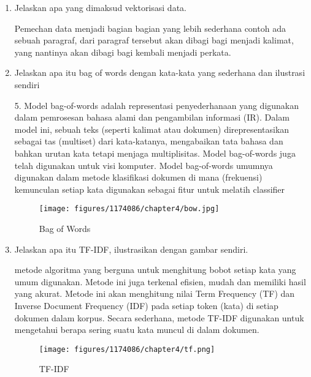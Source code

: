 \begin{enumerate}
        \item Jelaskan apa yang dimaksud vektorisasi data.
        
        Pemechan data menjadi bagian bagian yang lebih sederhana contoh ada sebuah paragraf, dari paragraf tersebut akan dibagi bagi menjadi kalimat, yang nantinya akan dibagi bagi kembali menjadi perkata.

        \item Jelaskan apa itu bag of words dengan kata-kata yang sederhana dan ilustrasi sendiri
        
        5.  Model bag-of-words adalah representasi penyederhanaan yang digunakan dalam pemrosesan bahasa alami dan pengambilan informasi (IR). Dalam model ini, sebuah teks (seperti kalimat atau dokumen) direpresentasikan sebagai tas (multiset) dari kata-katanya, mengabaikan tata bahasa dan bahkan urutan kata tetapi menjaga multiplisitas. Model bag-of-words juga telah digunakan untuk visi komputer. Model bag-of-words umumnya digunakan dalam metode klasifikasi dokumen di mana (frekuensi) kemunculan setiap kata digunakan sebagai fitur untuk melatih classifier
        \begin{figure}[H]
            \texttt{[image: figures/1174086/chapter4/bow.jpg]}
            \centering
            \caption{Bag of Words}
        \end{figure}

        \item Jelaskan apa itu TF-IDF, ilustrasikan dengan gambar sendiri.
        
        metode algoritma yang berguna untuk menghitung bobot setiap kata yang umum digunakan. Metode ini juga terkenal efisien, mudah dan memiliki hasil yang akurat. Metode ini akan menghitung nilai Term Frequency (TF) dan Inverse Document Frequency (IDF) pada setiap token (kata) di setiap dokumen dalam korpus. Secara sederhana, metode TF-IDF digunakan untuk mengetahui berapa sering suatu kata muncul di dalam dokumen.
        \begin{figure}[H]
            \texttt{[image: figures/1174086/chapter4/tf.png]}
            \centering
            \caption{TF-IDF}
        \end{figure}

    \end{enumerate}

